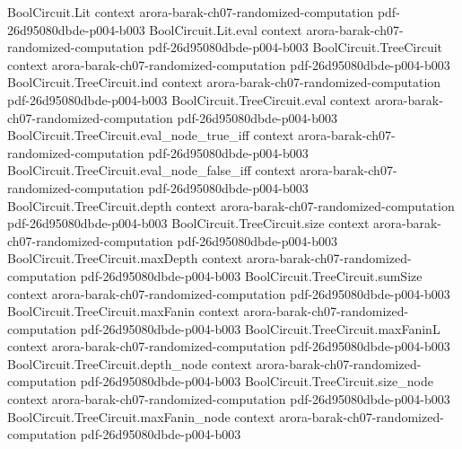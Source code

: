 \begin{theorem}
\label{Randomized.PITLang_mem_coRP_PTM}
\leanok
{}
\proofstep
  {BoolCircuit.Lit}
  {context}
  {arora-barak-ch07-randomized-computation}
  {pdf-26d95080dbde-p004-b003}
\proofstep
  {BoolCircuit.Lit.eval}
  {context}
  {arora-barak-ch07-randomized-computation}
  {pdf-26d95080dbde-p004-b003}
\proofstep
  {BoolCircuit.TreeCircuit}
  {context}
  {arora-barak-ch07-randomized-computation}
  {pdf-26d95080dbde-p004-b003}
\proofstep
  {BoolCircuit.TreeCircuit.ind}
  {context}
  {arora-barak-ch07-randomized-computation}
  {pdf-26d95080dbde-p004-b003}
\proofstep
  {BoolCircuit.TreeCircuit.eval}
  {context}
  {arora-barak-ch07-randomized-computation}
  {pdf-26d95080dbde-p004-b003}
\proofstep
  {BoolCircuit.TreeCircuit.eval_node_true_iff}
  {context}
  {arora-barak-ch07-randomized-computation}
  {pdf-26d95080dbde-p004-b003}
\proofstep
  {BoolCircuit.TreeCircuit.eval_node_false_iff}
  {context}
  {arora-barak-ch07-randomized-computation}
  {pdf-26d95080dbde-p004-b003}
\proofstep
  {BoolCircuit.TreeCircuit.depth}
  {context}
  {arora-barak-ch07-randomized-computation}
  {pdf-26d95080dbde-p004-b003}
\proofstep
  {BoolCircuit.TreeCircuit.size}
  {context}
  {arora-barak-ch07-randomized-computation}
  {pdf-26d95080dbde-p004-b003}
\proofstep
  {BoolCircuit.TreeCircuit.maxDepth}
  {context}
  {arora-barak-ch07-randomized-computation}
  {pdf-26d95080dbde-p004-b003}
\proofstep
  {BoolCircuit.TreeCircuit.sumSize}
  {context}
  {arora-barak-ch07-randomized-computation}
  {pdf-26d95080dbde-p004-b003}
\proofstep
  {BoolCircuit.TreeCircuit.maxFanin}
  {context}
  {arora-barak-ch07-randomized-computation}
  {pdf-26d95080dbde-p004-b003}
\proofstep
  {BoolCircuit.TreeCircuit.maxFaninL}
  {context}
  {arora-barak-ch07-randomized-computation}
  {pdf-26d95080dbde-p004-b003}
\proofstep
  {BoolCircuit.TreeCircuit.depth_node}
  {context}
  {arora-barak-ch07-randomized-computation}
  {pdf-26d95080dbde-p004-b003}
\proofstep
  {BoolCircuit.TreeCircuit.size_node}
  {context}
  {arora-barak-ch07-randomized-computation}
  {pdf-26d95080dbde-p004-b003}
\proofstep
  {BoolCircuit.TreeCircuit.maxFanin_node}
  {context}
  {arora-barak-ch07-randomized-computation}
  {pdf-26d95080dbde-p004-b003}

\end{theorem}
